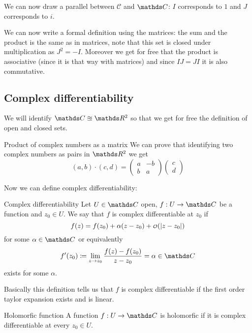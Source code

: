 \documentclass[12pt]{extarticle}
\begin{document}
We can now draw a parallel between $\mathcal C$ and $\C$:
$I$ corresponds to $1$ and $J$ corresponds to $i$.

We can now write a formal definition using the matrices:
the sum and the product is the same as in matrices,
note that this set is closed under multiplication as $J ^2 = -I$.
Moreover we get for free that the product is associative (since it is that way with matrices)
and since $IJ = JI$ it is also commutative.

\subsection{Complex differentiability}
We will identify $\C \approxeq \R^2$ so that we get for free the definition of open and closed sets.

\begin{remark}{Product of complex numbers as a matrix}{}
	We can prove that identifying two complex numbers as pairs in $\R^2$ we get
	\begin{equation}
		(a, b) \cdot (c, d) = \begin{pmatrix} a & -b \\ b & a \end{pmatrix}
		\begin{pmatrix} c \\d \end{pmatrix}
	\end{equation}
\end{remark}

Now we can define complex differentiability:
\begin{definition}{Complex differentiability}{}
	Let $U \in \C$ open, $f: U \to \C$ be a function and $z_0 \in U$.
	We say that $f$ is complex differentiable at $z_0$ if
	\begin{equation}
		f(z) = f(z_0) + \alpha (z-z_0) + \o(\abs{z -z_0})
	\end{equation}
	for some $\alpha \in \C$ or equivalently
	\begin{equation}
		f'(z_0) \coloneq \lim_{z \to z_0} \frac{f(z) - f(z_0)}{z - z_0} = \alpha \in \C
	\end{equation}
	exists for some $\alpha$.
\end{definition}
Basically this definition tells us that $f$ is complex differentiable
if the first order taylor expansion exists and is linear.

\begin{definition}{Holomorfic function}{}
	A function $f: U \to \C$ is holomorfic if it is complex differentiable at every $z_0 \in U$.
\end{definition}
\end{document}
